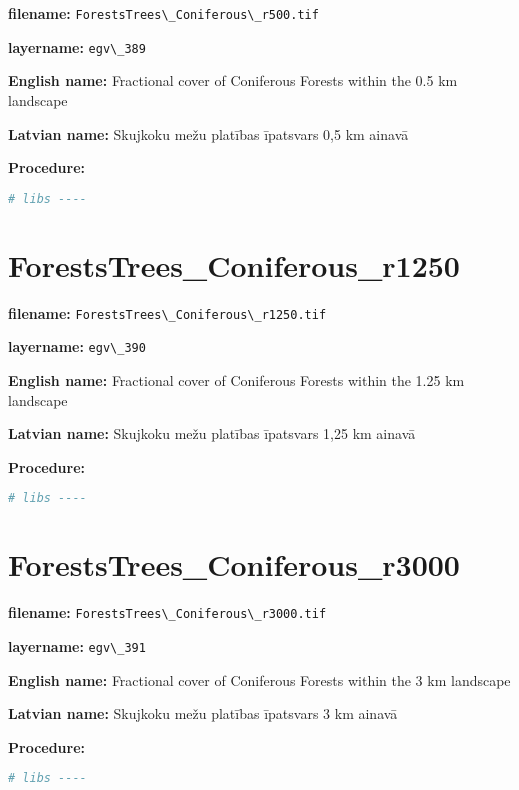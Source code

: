 \documentclass[
]{book}
\newcommand{\passthrough}[1]{#1}
\begin{document}
\textbf{filename:} \passthrough{\lstinline!ForestsTrees\_Coniferous\_r500.tif!}

\textbf{layername:} \passthrough{\lstinline!egv\_389!}

\textbf{English name:} Fractional cover of Coniferous Forests within the 0.5 km landscape

\textbf{Latvian name:} Skujkoku mežu platības īpatsvars 0,5 km ainavā

\textbf{Procedure:}

\begin{lstlisting}[language=R]
# libs ----
\end{lstlisting}

\section{ForestsTrees\_Coniferous\_r1250}\label{ch06.390}

\textbf{filename:} \passthrough{\lstinline!ForestsTrees\_Coniferous\_r1250.tif!}

\textbf{layername:} \passthrough{\lstinline!egv\_390!}

\textbf{English name:} Fractional cover of Coniferous Forests within the 1.25 km landscape

\textbf{Latvian name:} Skujkoku mežu platības īpatsvars 1,25 km ainavā

\textbf{Procedure:}

\begin{lstlisting}[language=R]
# libs ----
\end{lstlisting}

\section{ForestsTrees\_Coniferous\_r3000}\label{ch06.391}

\textbf{filename:} \passthrough{\lstinline!ForestsTrees\_Coniferous\_r3000.tif!}

\textbf{layername:} \passthrough{\lstinline!egv\_391!}

\textbf{English name:} Fractional cover of Coniferous Forests within the 3 km landscape

\textbf{Latvian name:} Skujkoku mežu platības īpatsvars 3 km ainavā

\textbf{Procedure:}

\begin{lstlisting}[language=R]
# libs ----
\end{lstlisting}
\end{document}
